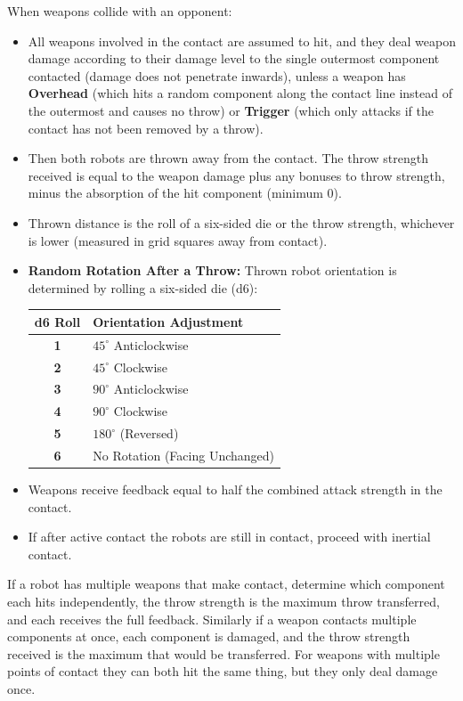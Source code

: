 \documentclass[11pt,a4paper]{article}
\newcommand{\inlineIcon}[1]{\raisebox{-0.22ex}{\resizebox{!}{1.15em}{#1}}}
\begin{document}
When weapons collide with an opponent:
\begin{itemize}[leftmargin=*, noitemsep, topsep=1pt]
  \item All weapons involved in the contact are assumed to hit, and they deal weapon damage \inlineIcon{\resourceW} according to their damage level to the single outermost component contacted (damage does not penetrate inwards), unless a weapon has \textbf{Overhead} (which hits a random component along the contact line instead of the outermost and causes no throw) or \textbf{Trigger} (which only attacks if the contact has not been removed by a throw).
  \item Then both robots are thrown away from the contact. The throw strength received is equal to the weapon damage \inlineIcon{\resourceW} plus any bonuses to throw strength, minus the absorption of the hit component (minimum 0).
  \item Thrown distance is the roll of a six-sided die or the throw strength, whichever is lower (measured in grid squares away from contact).
  \item \textbf{Random Rotation After a Throw:} Thrown robot orientation is determined by rolling a six-sided die (d6):
  \begin{center}
  \small
  \begin{tabular}{c l}
    \toprule
    \textbf{d6 Roll} & \textbf{Orientation Adjustment} \\
    \midrule
    \textbf{1} & $45^\circ$ Anticlockwise \\
    \textbf{2} & $45^\circ$ Clockwise \\
    \textbf{3} & $90^\circ$ Anticlockwise \\
    \textbf{4} & $90^\circ$ Clockwise \\
    \textbf{5} & $180^\circ$ (Reversed) \\
    \textbf{6} & No Rotation (Facing Unchanged) \\
    \bottomrule
  \end{tabular}
  \end{center}
  \item Weapons receive feedback equal to half the combined attack strength in the contact.
  \item If after active contact the robots are still in contact, proceed with inertial contact.
\end{itemize}

If a robot has multiple weapons that make contact, determine which component each hits independently, the throw strength is the maximum throw transferred, and each receives the full feedback.
Similarly if a weapon contacts multiple components at once, each component is damaged, and the throw strength received is the maximum that would be transferred. For weapons with multiple points of contact they can both hit the same thing, but they only deal damage once.
\end{document}
